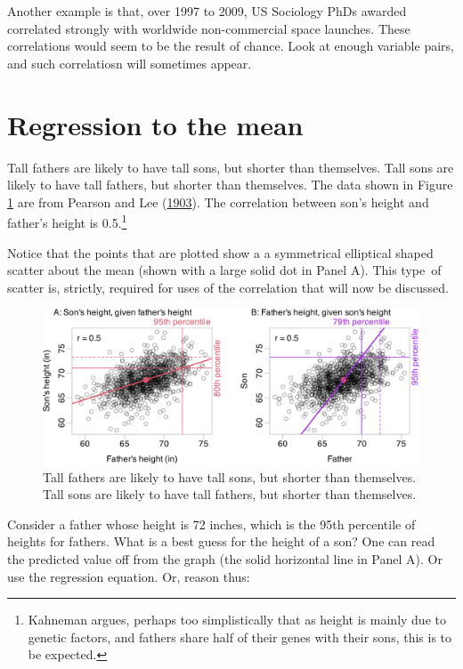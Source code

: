 \documentclass[
  10pt,
  b5paper]{book}
\begin{document}
Another example is that, over 1997 to 2009, US Sociology PhDs awarded correlated strongly with worldwide non-commercial space launches. These correlations would seem to be the result of chance. Look at enough variable pairs, and such correlatiosn will sometimes appear.

\hypertarget{regression-to-the-mean}{%
\section{Regression to the mean}\label{regression-to-the-mean}}

Tall fathers are likely to have tall sons, but shorter than themselves. Tall sons are likely to have tall fathers, but shorter than themselves. The data shown in Figure \ref{fig:pearson} are from Pearson and Lee (\protect\hyperlink{ref-pearson1903laws}{1903}). The correlation between son's height and father's height is 0.5.\footnote{Kahneman argues, perhaps too simplistically that as height is mainly due to genetic factors, and fathers share half of their genes with their sons, this is to be expected.}

Notice that the points that are plotted show a a symmetrical elliptical shaped scatter about the mean (shown with a large solid dot in Panel A). This type~of scatter is, strictly, required for uses of the correlation that will now be discussed.

\begin{figure}[H]

{\centering \includegraphics[width=1\linewidth]{07-regress_files/figure-latex/pearson-1} 

}

\caption{Tall fathers are likely to have tall sons, but shorter than themselves. 
Tall sons are likely to have tall fathers, but shorter than themselves.}\label{fig:pearson}
\end{figure}

Consider a father whose height is 72 inches, which is the 95th percentile of heights for fathers. What is a best guess for the height of a son? One can read the predicted value off from the graph (the solid horizontal line in Panel A). Or use the regression equation. Or, reason thus:
\end{document}
